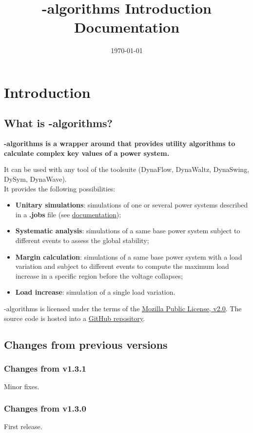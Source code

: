 \documentclass[a4paper, 12pt]{report}
\begin{document}
\title{\Dynawo-algorithms Introduction Documentation}
\date\today

\maketitle
\tableofcontents

\chapter{Introduction}

\section{What is \Dynawo-algorithms?}

\textbf{\Dynawo-algorithms is a wrapper around  \href{https://dynawo.github.io/}{\underline{\Dynawo}} 
that provides utility algorithms to calculate complex key values of a power system.} 

It can be used with any tool of the \Dynawo toolsuite (DynaFlow, DynaWaltz, DynaSwing, DySym, DynaWave).\\

It provides the following possibilities:
\begin{itemize}
  \item \textbf{Unitary simulations}: simulations of one or several power systems described in a \textbf{.jobs} file 
  (see \href{https://github.com/dynawo/dynawo-algorithms/releases/download/v1.3.1/DynawoAlgorithmsDocumentation.pdf}{\underline{\Dynawo documentation}});
  \item \textbf{Systematic analysis}: simulations of a same base power system subject to different events to assess the global stability;
  \item \textbf{Margin calculation}: simulations of a same base power system with a load variation and subject to different events to compute 
  the maximum load increase in a specific region before the voltage collapses;
  \item \textbf{Load increase}: simulation of a single load variation.
\end{itemize}

\Dynawo-algorithms is licensed under the terms of the \href{http://mozilla.org/MPL/2.0}{\underline{Mozilla Public License, v2.0}}.
The source code is hosted into a \href{https://github.com/dynawo/dynawo-algorithms} {\underline{GitHub repository}}. \\

\section{Changes from previous versions}

\subsection{Changes from v1.3.1}
Minor fixes.

\subsection{Changes from v1.3.0}
First release.
\end{document}
